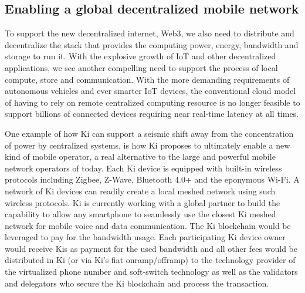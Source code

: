 \subsection{Enabling a global decentralized mobile network}
\label{sec:kiecosystemmobile}
To support the new decentralized internet, Web3, we also need to distribute and decentralize the stack that provides the computing power, energy, bandwidth and storage to run it. With the explosive growth of IoT and other decentralized applications, we see another compelling need to support the process of local compute, store and communication. With the more demanding requirements of autonomous vehicles and ever smarter IoT devices, the conventional cloud model of having to rely on remote centralized computing resource is no longer feasible to support billions of connected devices requiring near real-time latency at all times.

One example of how Ki can support a seismic shift away from the concentration of power by centralized systems, is how Ki proposes to ultimately enable a new kind of mobile operator, a real alternative to the large and powerful mobile network operators of today. Each Ki device is equipped with built-in wireless protocols including Zigbee, Z-Wave, Bluetooth 4.0+ and the eponymous Wi-Fi. A network of Ki devices can readily create a local meshed network using such wireless protocols. Ki is currently working with a global partner to build the capability to allow any smartphone to seamlessly use the closest Ki meshed network for mobile voice and data communication. The Ki blockchain would be leveraged to pay for the bandwidth usage. Each participating Ki device owner would receive Kis as payment for the used bandwidth and all other fees would be distributed in Ki (or via Ki's fiat onramp/offramp) to the technology provider of the virtualized phone number and soft-switch technology as well as the validators and delegators who secure the Ki blockchain and process the transaction. 

